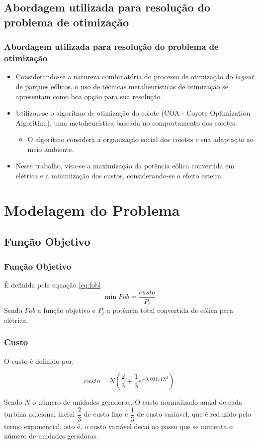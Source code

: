 \documentclass{beamer}
\begin{document}
	\subsection{Abordagem utilizada para resolução do problema de otimização}
	\begin{frame}
		\frametitle{Abordagem utilizada para resolução do problema de otimização}
		\begin{itemize}
			\item Considerando-se a natureza combinatória do processo de otimização do \textit{layout} de parques eólicos, o uso de técnicas metaheurísticas de otimização se apresentam como boa opção para sua resolução. \cite{FredericoFerreiraPanoeiro2018}
			\item Utilizou-se o algoritmo de otimização do coiote (COA - Coyote Optimization Algorithm), uma metaheurística baseada no comportamento dos coiotes. \cite{Pierezan2018}
			\begin{itemize}
				\item O algoritmo considera a organização social dos coiotes e sua adaptação ao meio ambiente.
			\end{itemize}
			\item Nesse trabalho, visa-se a maximização da potência eólica convertida em elétrica e a minimização dos custos, considerando-se o efeito esteira.
		\end{itemize}
	\end{frame}

	\section{Modelagem do Problema}
	
	\subsection{Função Objetivo}
	\begin{frame}
		\frametitle{Função Objetivo}
		É definida pela equação \ref{eq:fob} \cite{mosetti}
		\begin{equation}\label{eq:fob}
			\min Fob = \dfrac{custo}{P_t}
		\end{equation}
		Sendo $ Fob $ a função objetivo e $ P_t $ a potência total convertida de eólica para elétrica.
		
	
	\end{frame}

	\begin{frame}
		\frametitle{Custo}
		
		O custo é definido por:
		
		\begin{equation}\label{eq:custo}
			custo = N\left(\dfrac{2}{3} + \dfrac{1}{3}e^{-0,00174N^2}\right)
		\end{equation}
		
		Sendo $ N $ o número de unidades geradoras. O custo normalizado anual de cada turbina adicional inclui $ \dfrac{2}{3} $ de custo fixo e $ \dfrac{1}{3} $ de custo variável, que é reduzido pelo termo exponencial, isto é, o custo variável decai ao passo que se aumenta o número de unidades geradoras.
	\end{frame}
\end{document}
